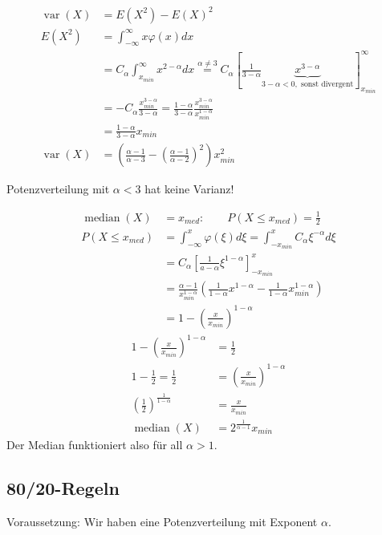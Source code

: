 \documentclass[10pt,a4paper]{scrartcl}
\DeclareMathOperator{\var}{var}
\DeclareMathOperator{\median}{median}
\begin{document}
\begin{align*}
    \var(X) & = E(X^2) - E(X)^2 \\
    E(X^2)  & = \int_{-\infty}^\infty x \varphi(x) dx \\
            & = C_\alpha \int_{x_{min}}^\infty x^{2-\alpha} dx 
             \stackrel{\alpha\neq3}{=} C_\alpha \left[ \frac{1}{3-\alpha} \underbrace{x^{3-\alpha}}_{3-\alpha < 0, \text{ sonst divergent}} \right]_{x_{min}}^\infty \\
            & = -C_\alpha \frac{x_{min}^{3-\alpha}}{3-\alpha} = \frac{1-\alpha}{3-\alpha} \frac{x_{min}^{3-\alpha}}{x_{min}^{1-\alpha}} \\
            & = \frac{1-\alpha}{3-\alpha} x_{min} \\
    \var(X) & = \left( \frac{\alpha-1}{\alpha-3} - \left(\frac{\alpha-1}{\alpha-2}\right)^2 \right) x_{min}^2
\end{align*}

Potenzverteilung mit $\alpha < 3$ hat keine Varianz!

\begin{align*}
         \median(X) & = x_{med} : \qquad P(X \le x_{med}) = \frac{1}{2} \\
    P(X\le x_{med}) & = \int_{-\infty}^x \varphi(\xi)d\xi = \int_{-x_{min}}^x C_\alpha \xi^{-\alpha} d\xi \\
                    & = C_\alpha \left[\frac{1}{a-\alpha} \xi^{1-\alpha}\right]_{-x_{min}}^x \\
                    & = \frac{\alpha-1}{x_{min}^{1-\alpha}} \left(\frac{1}{1-\alpha} x^{1-\alpha} - \frac{1}{1-\alpha} x_{min}^{1-\alpha}\right)\\
                    & = 1 - \left(\frac{x}{x_{min}}\right)^{1-\alpha}
\end{align*}
\begin{align*}
         1 - \left(\frac{x}{x_{min}}\right)^{1-\alpha} &= \frac{1}{2} \\
         1-\frac{1}{2} = \frac{1}{2} & = \left(\frac{x}{x_{min}}\right)^{1-\alpha} \\
         \left(\frac{1}{2}\right)^{\frac{1}{1-\alpha}} & = \frac{x}{x_{min}} \\
         \median(X) & = 2^{\frac{1}{\alpha-1}} x_{min}
\end{align*}
Der Median funktioniert also für all $\alpha>1$.
\fi

\subsection{80/20-Regeln}
Voraussetzung: Wir haben eine Potenzverteilung mit Exponent $\alpha$.
\end{document}
